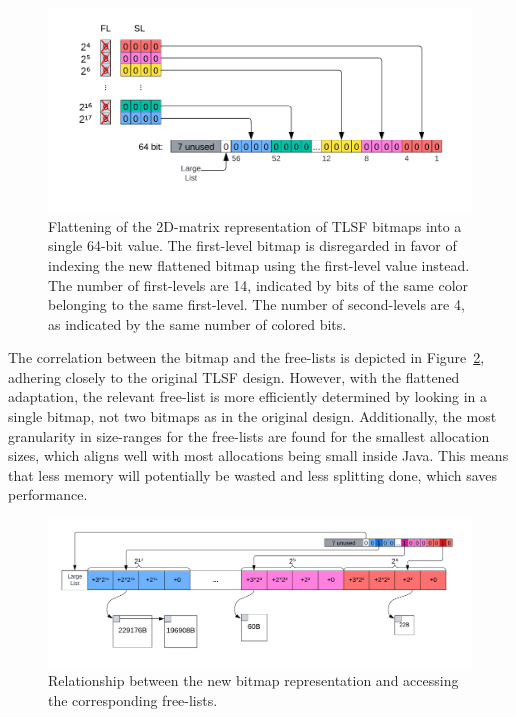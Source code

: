 \begin{figure}[H]
    \centering
    \includegraphics[width=1\textwidth]{figures/bitmap_flattening.png}
    \caption{Flattening of the 2D-matrix representation of TLSF bitmaps into a single 64-bit value. The first-level bitmap is disregarded in favor of indexing the new flattened bitmap using the first-level value instead. The number of first-levels are 14, indicated by bits of the same color belonging to the same first-level. The number of second-levels are 4, as indicated by the same number of colored bits.}
    \label{fig:bitmap_flattening}
\end{figure}

The correlation between the bitmap and the free-lists is depicted in Figure~\ref{fig:bitmap_relationship}, adhering closely to the original TLSF design. However, with the flattened adaptation, the relevant free-list is more efficiently determined by looking in a single bitmap, not two bitmaps as in the original design. Additionally, the most granularity in size-ranges for the free-lists are found for the smallest allocation sizes, which aligns well with most allocations being small inside Java. This means that less memory will potentially be wasted and less splitting done, which saves performance.

\begin{figure}[H]
    \centering
    \includegraphics[width=1\textwidth]{figures/bitmap_relationship.png}
    \caption{Relationship between the new bitmap representation and accessing the corresponding free-lists.}
    \label{fig:bitmap_relationship}
\end{figure}

